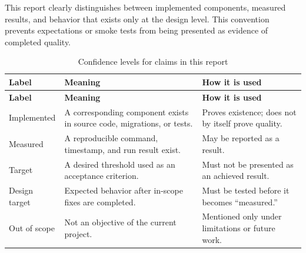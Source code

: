 
This report clearly distinguishes between implemented components, measured
results, and behavior that exists only at the design level. This convention
prevents expectations or smoke tests from being presented as evidence of
completed quality.

\begin{longtable}{@{}L{3.0cm}L{5.2cm}L{5.8cm}@{}}
  \caption{Confidence levels for claims in this report}\label{tab:report-status}\\
  \toprule
  \textbf{Label} & \textbf{Meaning} & \textbf{How it is used} \\
  \midrule
  \endfirsthead
  \toprule
  \textbf{Label} & \textbf{Meaning} & \textbf{How it is used} \\
  \midrule
  \endhead
  Implemented & A corresponding component exists in source code, migrations, or tests. & Proves existence; does not by itself prove quality. \\
  Measured & A reproducible command, timestamp, and run result exist. & May be reported as a result. \\
  Target & A desired threshold used as an acceptance criterion. & Must not be presented as an achieved result. \\
  Design target & Expected behavior after in-scope fixes are completed. & Must be tested before it becomes ``measured.'' \\
  Out of scope & Not an objective of the current project. & Mentioned only under limitations or future work. \\
  \bottomrule
\end{longtable}
